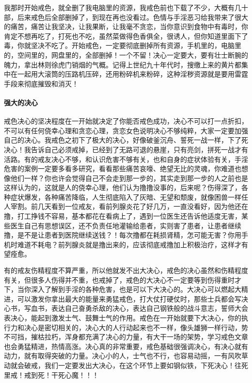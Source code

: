 我那时开始戒色，就全删了我电脑里的资源，我戒色前也下载了不少，大概有几十部，后来戒色后全部删掉了，到现在再也没看过。色情与手淫恶习给我带来了很大的痛苦，痛苦让我坚决，让我果断，让我毫不贪恋，当你意识到食物中有毒时，你肯定不想再吃了，打死也不吃，虽然菜做得色香俱全，很诱人，但你知道里面下了毒，你就坚决不吃了。开始戒色，一定要彻底删掉所有资源，手机里的，电脑里的，空间里的，网盘里的，全部删掉！一个不留！决心一定要大，要有壮士断腕的魄力，拿出林则徐虎门销烟的气概。记得上世纪九十年代时，搜缴上来的黄片都集中在一起用大滚筒的压路机压碎，还用粉碎机来粉碎，这种淫秽资源就是要用雷霆手段来彻底摧毁和消灭！

\paragraph{强大的决心}

戒色决心的坚决程度在一开始就决定了你能否戒色成功，决心不可以打一点折扣，不可以有任何侥幸心理和贪恋心理，贪恋女色说明决心不够纯粹，大家一定要加强自己的决心。我戒色之初下了极大的决心，好像破釜沉舟、誓死一战一样，下了死决心！我告诉自己必须戒掉，已经到了无路可退的悬崖，只有亮剑，拼死一战才有活路。有的戒友决心不够，和认识危害不够有关，也和自身的症状体验有关，手淫危害的案例一定要多看多研究，看看那些痛苦哀嚎、绝望无比的灵魂，你难道也想像他们一样？你也许会觉得自己不会走到那一步的，其实走到那一步的人之前也是这样认为的，这就是人的侥幸心理，他们认为撸撸没事的，后来呢？伤得深了，各种症状爆发，各种痛苦降临，人生彻底陷入了灰暗、无望和颓废，就像困兽一样任人宰割。前几天看到一位戒友，看前列腺炎花了好几万，一直没看好，因为他还在撸，打工挣钱不容易，基本都花在看病上了，遇到一位医生还告诉他适度无害，某些医生自己有思想误区，还不负责任地灌输给患者，实则害了患者，让患者继续撸，是不是让患者到医院继续送钱？！每次撸都在耗损肾精，怎可能无害？你用手机时难道不耗电？前列腺炎就是撸出来的，应该彻底戒撸加上积极治疗，这样才有望痊愈。

有的戒友伤精程度不算严重，所以他就发不出大决心，戒色的决心虽然和伤精程度有关，但很多人伤得并不重，也戒掉了，戒色的大决心不一定要等到伤得重时才下，当你深入了解到手淫的各种危害，也是可以下大决心的。大决心可以燃起大精进，可以激发你拿出最大的能量来勇猛戒色，打大仗打硬仗时，那些士兵都会写决心书，写血书，表达自己奋勇杀敌的决心，表达自己钢铁般的战斗意志，誓师大会表决心，能起到激发士气、鼓舞士气的作用。戒色在一开始就要下大决心，你的执行力和决心是密切相关的，决心大的人行动起来也不一样，像头雄狮一样行动，势不可挡，摧枯拉朽，浑身都充满了决心的力量，有大干一场的架势，学习戒色文章也会勇猛精进，热情高涨。决心真的非常重要，戒色基础很强调决心，有决心就有动力，就有取得突破的力量。决心小的人，士气也不行，也容易动摇，一有风吹草动就会破戒，我们一定要发出大决心，在这个环节上要如钢似铁，下死决心！往死里戒！戒到死！干死心魔！！！

